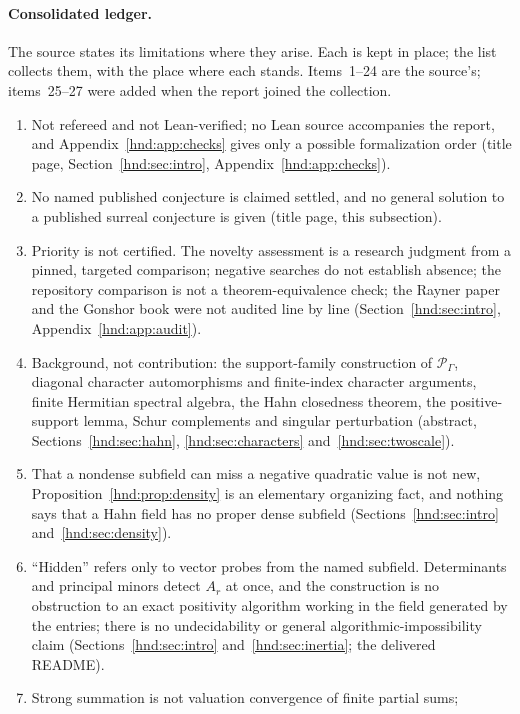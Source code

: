 \documentclass[11pt,oneside]{article}
\theoremstyle{definition}
\theoremstyle{remark}
\newcommand{\Pfield}{\mathscr P_\Gamma}
\begin{document}
\paragraph{Consolidated ledger.} The source states its limitations where
they arise. Each is kept in place; the list collects them, with the
place where each stands. Items~1--24 are the source's; items~25--27 were
added when the report joined the collection.
\begin{enumerate}[label=\arabic*.,leftmargin=2.2em]
\item Not refereed and not Lean-verified; no Lean source accompanies the
report, and Appendix~\ref{hnd:app:checks} gives only a possible
formalization order (title page, Section~\ref{hnd:sec:intro},
Appendix~\ref{hnd:app:checks}).
\item No named published conjecture is claimed settled, and no general
solution to a published surreal conjecture is given (title page, this
subsection).
\item Priority is not certified. The novelty assessment is a research
judgment from a pinned, targeted comparison; negative searches do not
establish absence; the repository comparison is not a theorem-equivalence
check; the Rayner paper and the Gonshor book were not audited line by line
(Section~\ref{hnd:sec:intro}, Appendix~\ref{hnd:app:audit}).
\item Background, not contribution: the support-family construction of
$\Pfield$, diagonal character automorphisms and finite-index character
arguments, finite Hermitian spectral algebra, the Hahn closedness theorem,
the positive-support lemma, Schur complements and singular perturbation
(abstract, Sections~\ref{hnd:sec:hahn}, \ref{hnd:sec:characters}
and~\ref{hnd:sec:twoscale}).
\item That a nondense subfield can miss a negative quadratic value is not
new, Proposition~\ref{hnd:prop:density} is an elementary organizing fact,
and nothing says that a Hahn field has no proper dense subfield
(Sections~\ref{hnd:sec:intro} and~\ref{hnd:sec:density}).
\item ``Hidden'' refers only to vector probes from the named subfield.
Determinants and principal minors detect $A_r$ at once, and the
construction is no obstruction to an exact positivity algorithm working
in the field generated by the entries; there is no undecidability or
general algorithmic-impossibility claim (Sections~\ref{hnd:sec:intro}
and~\ref{hnd:sec:inertia}; the delivered README).
\item Strong summation is not valuation convergence of finite partial sums;

\end{enumerate}
\end{document}
